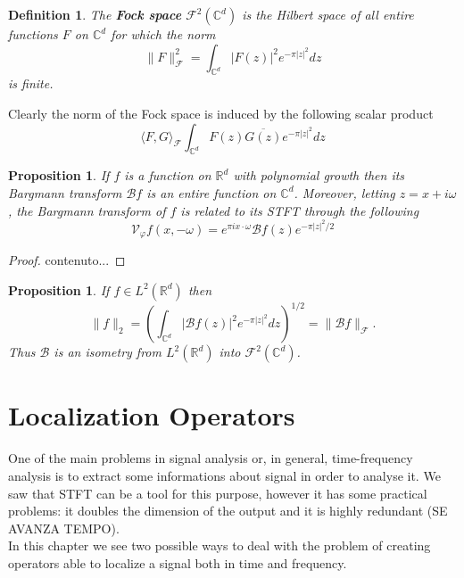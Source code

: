 \documentclass[corpo=11pt, stile=classica, tipotesi=custom,
greek, evenboxes, english]{toptesi}
\numberwithin{equation}{chapter}
\newtheorem{defi}[teo]{Definition}
\newtheorem{prop}[teo]{Proposition}
\newcommand{\R}{\mathbb{R}} %
\newcommand{\V}{\mathcal{V}} %
\newcommand{\Fock}{\mathcal{F}} %
\newcommand{\C}{\mathbb{C}} %
\newcommand{\Barg}{\mathcal{B}} %
\begin{document}
\begin{defi}\label{Fock space}
	The \textbf{Fock space} $\Fock^2(\C^d)$ is the Hilbert space of all entire functions $F$ on $\C^d$ for which the norm
	\begin{equation}\label{Fock space norm}
		\|F\|^2_{\Fock} = \int_{\C^d} |F(z)|^2 e^{-\pi |z|^2}dz
	\end{equation}
	is finite.
\end{defi}
Clearly the norm of the Fock space is induced by the following scalar product
\begin{equation}\label{Fock space scalar product}
	\langle F,G \rangle_{\Fock} \int_{\C^d} F(z) \overline{G(z)} e^{-\pi |z|^2}dz
\end{equation}
\begin{prop}
	If $f$ is a function on $\R^d$ with polynomial growth then its Bargmann transform $\Barg f$ is an entire function on $\C^d$. Moreover, letting $z = x + i\omega$, the Bargmann transform of $f$ is related to its STFT through the following
	\begin{equation}\label{connection between Bargmann transform and STFT}
		\V_{\varphi} f(x,-\omega) = e^{\pi i x \cdot \omega} \Barg f(z) e^{-\pi |z|^2/2}
	\end{equation}
\end{prop}
\begin{proof}
	contenuto...
\end{proof}
\begin{prop}
	If $f \in L^2(\R^d)$ then
	\begin{equation}
		\|f\|_2 = \left(\int_{\C^d} |\Barg f(z)|^2 e^{-\pi |z|^2}dz\right)^{1/2} = \|\Barg f\|_{\Fock}.
	\end{equation}
	Thus $\Barg$ is an isometry from $L^2(\R^d)$ into $\Fock^2(\C^d)$.
\end{prop}

\chapter{Localization Operators}\label{chapter localization operators}
One of the main problems in signal analysis or, in general, time-frequency analysis is to extract some informations about signal in order to analyse it. {\color{red}We saw that STFT can be a tool for this purpose, however it has some practical problems: it doubles the dimension of the output and it is highly redundant (SE AVANZA TEMPO).}\\
In this chapter we see two possible ways to deal with the problem of creating operators able to localize a signal both in time and frequency.
\end{document}
